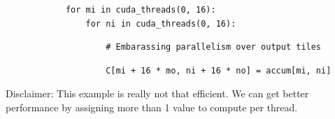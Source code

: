 \begin{minipage}[t]{0.5\textwidth}
{\begin{mdframed}[style=MyFrame, backgroundcolor=blueBoxBg]
\begin{verbatim}
            for mi in cuda_threads(0, 16):
                for ni in cuda_threads(0, 16):
\end{verbatim}
\end{mdframed}
\begin{mdframed}[style=MyFrame, backgroundcolor=redBoxBg]
\color{redBoxFg}
\begin{verbatim}
                    # Embarassing parallelism over output tiles
\end{verbatim}
\end{mdframed}
\begin{verbatim}
                    C[mi + 16 * mo, ni + 16 * no] = accum[mi, ni]
\end{verbatim}
}
\vspace{6mm}
Disclaimer: This example is really not that efficient.
We can get better performance by assigning more than 1 value to compute per thread.
\end{minipage}
\hfill
